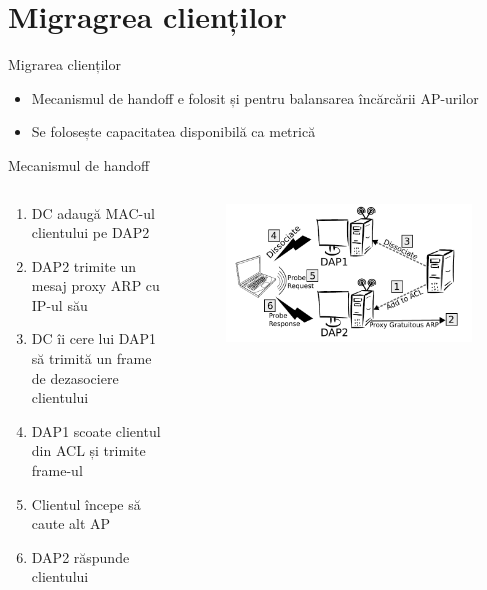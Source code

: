 \section{Migragrea clienților}

\begin{frame}{Migrarea clienților}
  \begin{itemize}
    \item Mecanismul de handoff e folosit și pentru balansarea încărcării AP-urilor
    \item Se folosește capacitatea disponibilă ca metrică
  \end{itemize}
\end{frame}

\begin{frame}{Mecanismul de handoff}
  \begin{columns}
  \begin{column}{0.5\linewidth}
    \begin{enumerate}
      \item DC adaugă MAC-ul clientului pe DAP2
      \item DAP2 trimite un mesaj proxy ARP cu IP-ul său
      \item DC îi cere lui DAP1 să trimită un frame de dezasociere clientului
      \item DAP1 scoate clientul din ACL și trimite frame-ul
      \item Clientul începe să caute alt AP
      \item DAP2 răspunde clientului
    \end{enumerate}
  \end{column}
  \begin{column}{0.5\linewidth}
    \begin{figure}
      \includegraphics[scale=0.20]{img/fig3.png}
    \end{figure}
  \end{column}
  \end{columns}
\end{frame}

